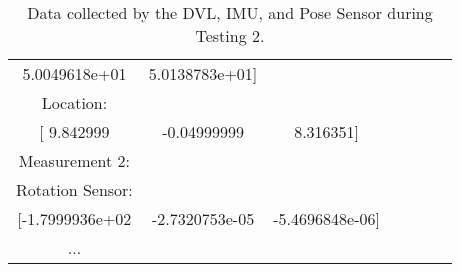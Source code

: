 \documentclass[]{article}
\begin{document}
\begin{table}[H]
\begin{center}
\begin{tabular}{ccccccc}
			\footnotesize 5.0049618e+01 & \footnotesize 5.0138783e+01] & \footnotesize  & \footnotesize  & \footnotesize  & \footnotesize & \footnotesize \\
			
			\footnotesize Location: & \footnotesize  & \footnotesize  & \footnotesize  & \footnotesize  & \footnotesize & \footnotesize \\
			
			 & \footnotesize  & \footnotesize & \footnotesize & \footnotesize \\
			
			\toprule
			
			\footnotesize Measurement 2: & \footnotesize  & \footnotesize & \footnotesize  & \footnotesize & \footnotesize & \footnotesize \\
			
			\midrule
			
			\footnotesize Rotation Sensor: & \footnotesize  & \footnotesize & \footnotesize  & \footnotesize  & \footnotesize  & \footnotesize \\
			
			\footnotesize [-1.7999936e+02 & \footnotesize -2.7320753e-05 & \footnotesize -5.4696848e-06] & \footnotesize  & \footnotesize & \footnotesize & \footnotesize \\
			
			\footnotesize ... & \footnotesize  & \footnotesize  & \footnotesize  & \footnotesize  & \footnotesize & \footnotesize \\

			\bottomrule
		\end{tabular}
		\caption{Data collected by the DVL, IMU, and Pose Sensor during Testing 2.}
	\end{center}
\end{table}

\newpage
\end{document}
